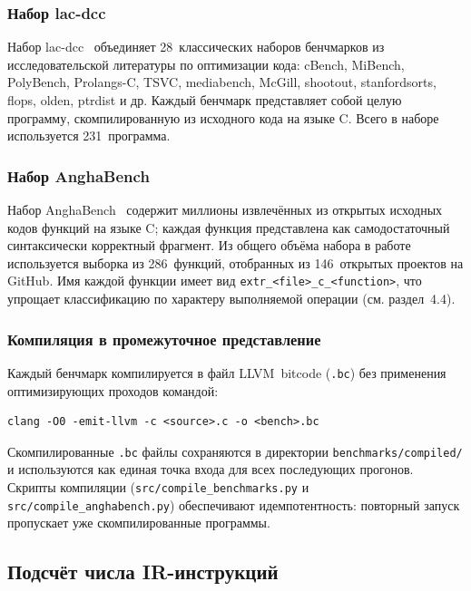 \subsubsection{Набор lac-dcc}

Набор lac-dcc~\cite{lacdcc_benchmarks} объединяет 28~классических наборов бенчмарков из исследовательской литературы по оптимизации кода: cBench, MiBench, Poly\-Bench, Pro\-langs-C, TSVC, media\-bench, McGill, shootout, stanford\-sorts, flops, olden, ptrdist и др. Каждый бенчмарк представляет собой целую программу, скомпилированную из исходного кода на языке C. Всего в наборе используется 231~программа.

\subsubsection{Набор AnghaBench}

Набор AnghaBench~\cite{daSilva2021anghabench} содержит миллионы извлечённых из открытых исходных кодов функций на языке C; каждая функция представлена как самодостаточный синтаксически корректный фрагмент. Из общего объёма набора в работе используется выборка из 286~функций, отобранных из 146~открытых проектов на GitHub. Имя каждой функции имеет вид \texttt{extr\_<file>\_c\_<function>}, что упрощает классификацию по характеру выполняемой операции (см. раздел~4.4).

\subsubsection{Компиляция в промежуточное представление}

Каждый бенчмарк компилируется в файл LLVM~bitcode (\texttt{.bc}) без применения оптимизирующих проходов командой:
\begin{verbatim}
clang -O0 -emit-llvm -c <source>.c -o <bench>.bc
\end{verbatim}
Скомпилированные \texttt{.bc} файлы сохраняются в директории \texttt{benchmarks/\allowbreak compiled/} и используются как единая точка входа для всех последующих прогонов. Скрипты компиляции (\texttt{src/\allowbreak compile\_\allowbreak benchmarks.py} и \texttt{src/\allowbreak compile\_\allowbreak anghabench.py}) обеспечивают идемпотентность: повторный запуск пропускает уже скомпилированные программы.

\subsection{Подсчёт числа IR-инструкций}

